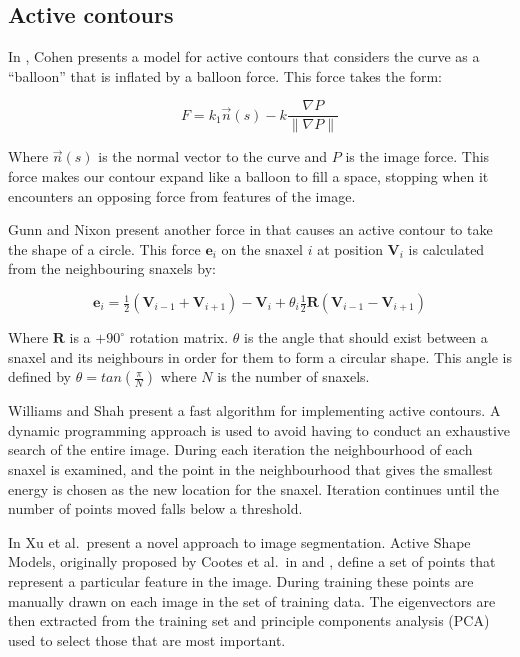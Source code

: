 \subsection{Active contours}\label{ContourBackground}

In \cite{CohenBalloons}, Cohen presents a model for active contours that considers the curve as a ``balloon'' that is inflated by a balloon force.
This force takes the form:

\begin{equation}
	F = k_1 \vec{n}(s) - k\frac{\nabla P}{\|\nabla P\|}
\end{equation}

\noindent Where $\vec{n}(s)$ is the normal vector to the curve and $P$ is the image force.
This force makes our contour expand like a balloon to fill a space, stopping when it encounters an opposing force from features of the image.

\bigskip
\noindent Gunn and Nixon present another force in \cite{GunnSnake} that causes an active contour to take the shape of a circle.
This force $\mathbf{e}_i$ on the snaxel $i$ at position $\mathbf{V}_i$ is calculated from the neighbouring snaxels by:

\begin{equation}
	\mathbf{e}_i = \tfrac{1}{2}(\mathbf{V}_{i-1} + \mathbf{V}_{i+1}) - \mathbf{V}_i + \theta_i\tfrac{1}{2}\mathbf{R}(\mathbf{V}_{i-1} - \mathbf{V}_{i+1})
\end{equation}

\noindent Where $\mathbf{R}$ is a $+90^\circ$ rotation matrix.
$\theta$ is the angle that should exist between a snaxel and its neighbours in order for them to form a circular shape.
This angle is defined by $\theta = tan(\frac{\pi}{N})$ where $N$ is the number of snaxels.

\bigskip
\noindent Williams and Shah \cite{SnakeAlgorithm} present a fast algorithm for implementing active contours.
A dynamic programming approach is used to avoid having to conduct an exhaustive search of the entire image.
During each iteration the neighbourhood of each snaxel is examined, and the point in the neighbourhood that gives the smallest energy is chosen as the new location for the snaxel.
Iteration continues until the number of points moved falls below a threshold.

\bigskip
\noindent In \cite{ImageSegModels} Xu et al.\ present a novel approach to image segmentation.
Active Shape Models, originally proposed by Cootes et al.\ in \cite{cootes93use} and \cite{cootes95}, define a set of points that represent a particular feature in the image.
During training these points are manually drawn on each image in the set of training data.
The eigenvectors are then extracted from the training set and principle components analysis (PCA) used to select those that are most important.

